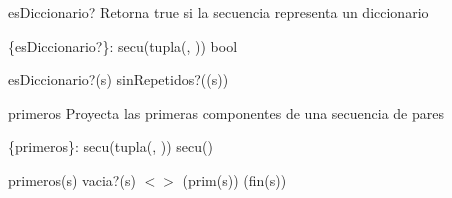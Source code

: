 \begin{DoxyParagraph}{es\-Diccionario?}
\-Retorna true si la secuencia representa un diccionario
\end{DoxyParagraph}
\{es\-Diccionario?\}\-: secu(tupla(, ))  bool\par
 es\-Diccionario?(s)  sin\-Repetidos?((s)) 

\begin{DoxyParagraph}{primeros}
\-Proyecta las primeras componentes de una secuencia de pares
\end{DoxyParagraph}
\{primeros\}\-: secu(tupla(, ))  secu()\par
 primeros(s)   vacia?(s)  $<$$>$  (prim(s))  (fin(s))   